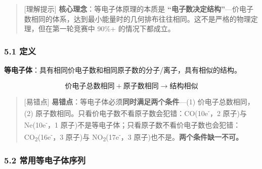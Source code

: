 \begin{quote}
{[}理解提示{]} \textbf{核心理念}：等电子体原理的本质是 \textbf{``电子数决定结构''}---价电子数相同的体系，达到最小能量时的几何排布往往相同。这不是严格的物理定理，但在第一轮竞赛中 90\%+ 的情况下都成立。
\end{quote}

\subsubsection{5.1 定义}\label{ux5b9aux4e49}

\textbf{等电子体}：具有相同价电子数和相同原子数的分子/离子，具有相似的结构。

\[
\text{价电子总数相同} + \text{原子数相同} \rightarrow \text{结构相似}
\]

\begin{quote}
{[}易错点{]} \textbf{易错点}：等电子体必须\textbf{同时满足两个条件}---(1) 价电子总数相同，(2) 原子数相同。只看价电子数不看原子数会犯错：CO(10e\textsuperscript{-}，2 原子)与 Ne(10e\textsuperscript{-}，1 原子)不是等电子体；只看原子数不看价电子数也会犯错：CO\textsubscript{2}(16e\textsuperscript{-}，3 原子)与 NO\textsubscript{2}(17e\textsuperscript{-}，3 原子)也不是。\textbf{两个条件缺一不可。}
\end{quote}

\subsubsection{5.2 常用等电子体序列}\label{ux5e38ux7528ux7b49ux7535ux5b50ux4f53ux5e8fux5217}

